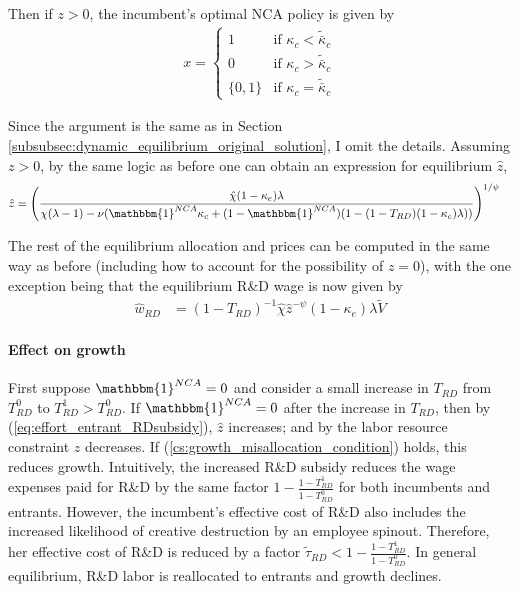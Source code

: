 \documentclass[11pt,english]{article}
\begin{document}
Then if $z > 0$, the incumbent's optimal NCA policy is given by 
\begin{align}
x = \begin{cases}
1 & \textrm{if } \kappa_{c} < \tilde{\bar{\kappa}}_c  \\
0 & \textrm{if } \kappa_{c} > \tilde{\bar{\kappa}}_c \\
\{0,1\} & \textrm{if } \kappa_c = \tilde{\bar{\kappa}}_c 
\end{cases} \label{eq:nca_policy_RDsubsidy}
\end{align}

Since the argument is the same as in Section \ref{subsubsec:dynamic_equilibrium_original_solution}, I omit the details. Assuming $z > 0$, by the same logic as before one can obtain an expression for equilibrium $\hat{z}$, 
\begin{align}
\hat{z} &= \Bigg( \frac{\hat{\chi} (1-\kappa_{e}) \lambda}{\chi(\lambda -1) - \nu (\mathbbm{1}^{NCA}\kappa_c + (1-\mathbbm{1}^{NCA})(1 - (1-T_{RD})(1-\kappa_e)\lambda)) } \Bigg)^{1/\psi} \label{eq:effort_entrant_RDsubsidy}
\end{align}

The rest of the equilibrium allocation and prices can be computed in the same way as before (including how to account for the possibility of $z = 0$), with the one exception being that the equilibrium R\&D wage is now given by 
\begin{align}
\hat{w}_{RD} &= (1-T_{RD})^{-1}\hat{\chi} \hat{z}^{-\psi} (1-\kappa_e) \lambda \tilde{V} \label{eq:wage_rd_labor_RDsubsidy}
\end{align}

\paragraph{Effect on growth}

First suppose $\mathbbm{1}^{NCA} = 0$ and consider a small increase in $T_{RD}$ from $T_{RD}^0$ to $T_{RD}^1 > T_{RD}^0$. If $\mathbbm{1}^{NCA} = 0$ after the increase in $T_{RD}$, then by (\ref{eq:effort_entrant_RDsubsidy}), $\hat{z}$ increases; and by the labor resource constraint $z$ decreases. If (\ref{cs:growth_misallocation_condition}) holds, this reduces growth. Intuitively, the increased R\&D subsidy reduces the wage expenses paid for R\&D by the same factor $1-\frac{1-T_{RD}^1}{1-T_{RD}^0}$ for both incumbents and entrants. However, the incumbent's effective cost of R\&D also includes the increased likelihood of creative destruction by an employee spinout. Therefore, her effective cost of R\&D is reduced by a factor $\tilde{\tau}_{RD} < 1-\frac{1-T_{RD}^1}{1-T_{RD}^0}$. In general equilibrium, R\&D labor is reallocated to entrants and growth declines.
\end{document}
